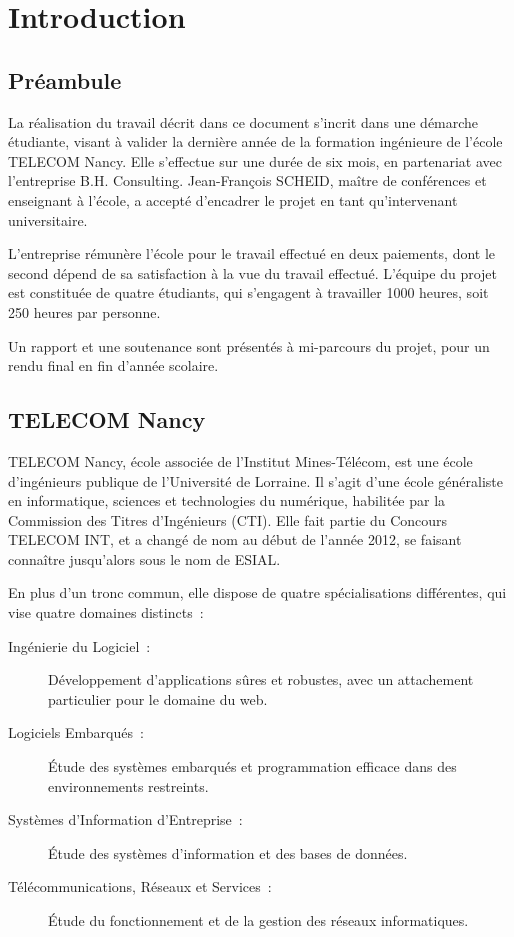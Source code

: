 \newcommand{\titreA}{Rapport de projet}
\newcommand{\titreB}{Projet industriel}


\listoffigures
\newpage

\section{Introduction}
\subsection{Préambule}

La réalisation du travail décrit dans ce document s'incrit dans une démarche étudiante, visant à valider la dernière année de la formation ingénieure de l'école TELECOM Nancy. Elle s'effectue sur une durée de six mois, en partenariat avec l'entreprise B.H. Consulting. Jean-François SCHEID, maître de conférences et enseignant à l'école, a accepté d'encadrer le projet en tant qu'intervenant universitaire.

L'entreprise rémunère l'école pour le travail effectué en deux paiements, dont le second dépend de sa satisfaction à la vue du travail effectué. L'équipe du projet est constituée de quatre étudiants, qui s'engagent à travailler 1000 heures, soit 250 heures par personne.

Un rapport et une soutenance sont présentés à mi-parcours du projet, pour un rendu final en fin d'année scolaire.

\subsection{TELECOM Nancy}

TELECOM Nancy, école associée de l'Institut Mines-Télécom, est une école d'ingénieurs publique de l'Université de Lorraine. Il s'agit d'une école généraliste en informatique, sciences et technologies du numérique, habilitée par la Commission des Titres d'Ingénieurs (CTI). Elle fait partie du Concours TELECOM INT, et a changé de nom au début de l'année 2012, se faisant connaître jusqu'alors sous le nom de ESIAL.

En plus d'un tronc commun, elle dispose de quatre spécialisations différentes, qui vise quatre domaines distincts~:

\begin{description}
\item[Ingénierie du Logiciel~:] Développement d'applications sûres et robustes, avec un attachement particulier pour le domaine du web.
\item[Logiciels Embarqués~:] Étude des systèmes embarqués et programmation efficace dans des environnements restreints.
\item[Systèmes d'Information d'Entreprise~:] Étude des systèmes d'information et des bases de données.
\item[Télécommunications, Réseaux et Services~:] Étude du fonctionnement et de la gestion des réseaux informatiques.
\end{description}


